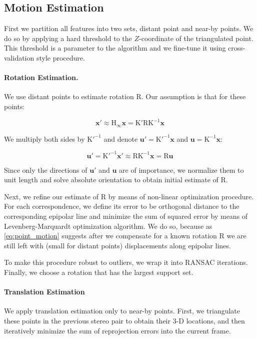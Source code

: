 \documentclass[runningheads]{llncs}
\begin{document}
\subsection{Motion Estimation}
First we partition all features into two sets, distant point and
near-by points.  We do so by applying a hard threshold to the
$Z$-coordinate of the triangulated point.  This threshold is a
parameter to the algorithm and we fine-tune it using cross-validation
style procedure.

\paragraph{Rotation Estimation.} We use distant points to estimate rotation $\mathrm{R}$. Our assumption is that for these points:

\begin{equation}
\mathbf{x}' \approx \mathrm{H}_\infty\mathbf{x} = \mathrm{K'RK^{-1}}\mathbf{x}
\end{equation}

We multiply both sides by $\mathrm{K'^{-1}}$ and denote $\mathbf{u'} = \mathrm{K'^{-1}}\mathbf{x}$ and $\mathbf{u} = \mathrm{K^{-1}}\mathbf{x}$:

\begin{equation}
\mathbf{u'} = \mathrm{K'^{-1}}\mathbf{x}' \approx \mathrm{RK^{-1}}\mathbf{x} = \mathrm{R}\mathbf{u}
\end{equation}

Since only the directions of $\mathbf{u'}$ and $\mathbf{u}$ are of
importance, we normalize them to unit length and solve absolute
orientation to obtain initial estimate of $\mathrm{R}$.

Next, we refine our estimate of $\mathrm{R}$ by means of non-linear
optimization procedure.  For each correspondence, we define its error
to be orthogonal distance to the corresponding epipolar line and
minimize the sum of squared error by means of Levenberg-Marquardt
optimization algorithm. We do so, because as \ref{eq:point_motion}
suggests after we compensate for a known rotation $\mathrm{R}$ we are
still left with (small for distant points) displacements along
epipolar lines.

To make this procedure robust to outliers, we wrap it into RANSAC
iterations.  Finally, we choose a rotation that has the largest
support set.

\paragraph{Translation Estimation} We apply translation estimation
only to near-by points.  First, we triangulate these points in the
previous stereo pair to obtain their 3-D locations, and then
iteratively minimize the sum of reprojection errors into the current
frame.
\end{document}
